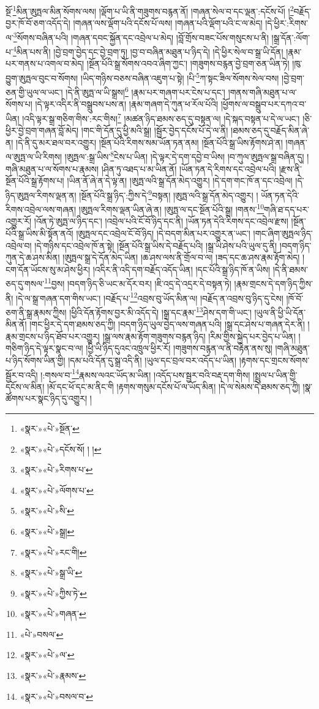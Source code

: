 སྔོ་\footnote{«སྣར་»«པེ་»སྔོན་}མིན་ཨུཏྤལ་མིན་སོགས་ལས། །ལྡོག་པ་ཡི་ནི་གཟུགས་བརྙན་ནོ། །གཞན་སེལ་བ་དང་ལྡན་:དངོས་པོ། །\footnote{«སྣར་»«པེ་»དངོས་སོ། ། །}བརྗོད་བྱར་ཁོ་བོ་ཅག་འདོད་དེ། །གཞན་ལས་ལྡོག་པའི་དངོས་པོ་ལས། །གཞན་པའི་ལྡོག་པའི་ང་ལ་མེད། །དེ་ཕྱིར་:རིགས་ལ་\footnote{«སྣར་»«པེ་»རིགས་པ་}སོགས་བཞིན་པའི། །གཞན་དབང་སྐྱོན་དང་འབྲེལ་པ་མེད། །བློ་གྲོས་བཟང་པོས་གསུངས་པ་ནི། །སྒྲ་དོན་:ལོག་པ་\footnote{«སྣར་»«པེ་»ལོགས་པ་}མིན་པས་ནི། །བྱེ་བྲག་བྱེད་དང་བྱེ་བྲག་ཏུ། །བྱ་བ་བཞིན་མཐུན་པ་ཉིད་དེ། །དེ་ཕྱིར་སེལ་བ་སྒྲ་ཡི་དོན། །རྣམ་པར་གནས་པ་འགལ་བ་མེད། །སྔོན་པོའི་སྒྲ་སོགས་འབའ་ཞིག་ཀྱང་། །གཟུགས་བརྙན་བྱེ་བྲག་ཅན་ཡིན་ཏེ། །ཁུ་བྱུག་ཨུཏྤལ་བུང་བ་སོགས། །ཡིད་གཉིས་བཅས་བཞིན་འཇུག་པ་སྟེ། །པི་\footnote{«སྣར་»«པེ་»སི་}ཀ་སྟང་ཟིལ་སོགས་སེལ་བས། །བྱེ་བྲག་ཅན་གྱི་ཡུལ་ལ་ཡང་། །དེ་ནི་ཨུཏྤ་ལ་ཡི་སྒྲས།\footnote{«སྣར་»«པེ་»སྒྲ།} །རྣམ་པར་གཞག་པར་ངེས་པ་དང་། །གནས་གཞི་མཐུན་པ་ལ་སོགས་པ། །དེ་ལྟར་འདིར་ནི་བསྒྲུབས་པས་ན། །རྣམ་གཞག་དེ་ཀུན་ཕ་རོལ་པོའི། །ཕྱོགས་ལ་བསྒྲུབ་པར་དཀའ་བ་ཡིན། །འདི་ལྟར་སྒྲ་གཅིག་གིས་:རང་གིས།\footnote{«སྣར་»«པེ་»རང་གི།} །མཚན་ཉིད་ཐམས་ཅད་དུ་བསྟན་ལ། །དེ་སྐད་བསྟན་པ་དེ་ལ་ཡང་། །ཅི་ཕྱིར་བྱེ་བྲག་གཞན་བློ་མེད། །གང་གི་དོན་དུ་ཕྱི་མའི་སྒྲ། །སྦྱོར་བྱེད་དངོས་པོ་དེ་ལ་ནི། །ཐམས་ཅད་དུ་བརྗོད་མིན་ཞེ་ན། །དེ་ནི་དུ་མར་ཐལ་བར་འགྱུར། །སྔོན་པོའི་རིགས་སམ་ཡོན་ཏན་ནམ། །སྔོན་པོའི་སྒྲ་ཡིས་རྟོགས་ཤེ་ན། །གཞན་ལ་ཨུཏྤ་ལ་ཡི་རིགས། །ཨུཏྤལ་:སྒྲ་ཡིས་\footnote{«སྣར་»«པེ་»སྒྲ་ཡི་}ངེས་པ་ཡིན། །དེ་ལྟར་དེ་དག་དབྱེ་བ་ཡིས། །བ་ཀུལ་ཨུཏྤལ་སྒྲ་བཞིན་དུ། །གཞི་མཐུན་པ་ལ་སོགས་པ་རྣམས། །ཤིན་ཏུ་འཐད་པ་མ་ཡིན་ནོ། །ཡོན་ཏན་དེ་རིགས་དང་འབྲེལ་པའི། །རྫས་ནི་སྔོན་པོའི་སྒྲ་རྟོགས་པ། །ཡིན་ནོ་ཞེ་ན་དེ་ལྟ་ན། །ཨུཏྤ་ལའི་སྒྲ་དོན་མེད་འགྱུར། །དེ་དག་གང་ཁོ་ན་དང་འབྲེལ། །དེ་ཉིད་ཨུཏྤལ་རིགས་ལྡན་ན། །སྔོན་པོའི་སྒྲ་ཉིད་:ཀྱིས་དེ་\footnote{«སྣར་»«པེ་»ཀྱིས་ཏེ་}བསྟན། །ཨུཏྤ་ལའི་སྒྲ་དོན་མེད་འགྱུར། །
ཡོན་ཏན་དེའི་རིགས་འབྲེལ་ལས་གཞན། །ཨུཏྤལ་རིགས་ལྡན་ཡིན་ཞེ་ན། །ཨུཏྤ་ལ་དང་སྔོན་པོའི་སྒྲ། །གནས་\footnote{«སྣར་»«པེ་»གཞན་}གཞི་ཐ་དད་པར་འགྱུར་རོ། །འོན་ཏེ་ཨུཏྤ་ལ་ཉིད་དང་། །འབྲེལ་པའི་ངོ་བོ་ཉིད་དང་ནི། །ཡོན་ཏན་དེའི་རིགས་དང་འབྲེལ་རྫས། །སྔོན་པོའི་སྒྲ་ཡིས་མི་སྟོན་ནའོ། །ཨུཏྤལ་དང་འབྲེལ་ངོ་བོ་ཉིད། །དེ་བདག་མིན་པར་འགྱུར་ན་ཡང་། །གང་ཞིག་ཨུཏྤལ་ཉིད་འབྲེལ་བ། །དེ་གཉིས་དང་འབྲེལ་ཁོ་ན་སྟེ། །སྔོན་པོའི་སྒྲ་ཡིས་དེ་བརྗོད་པའི། །སྒྲ་ཡི་ཤེས་པའི་ཡུལ་དུ་ནི། །བདག་ཉིད་ཀུན་དེ་ཆ་ཤས་མིན། །ཨུཏྤལ་སྒྲ་དེ་དོན་མེད་ཡིན། །ཆ་ཤས་ལས་ནི་གྲོལ་བ་ལ། །ཟད་དང་ཆ་ཤས་རྣམ་རྟོག་མེད། །ངག་དོན་ཡོངས་སུ་མ་ཤེས་ཕྱིར། །འདིར་ནི་འདི་དག་བརྗོད་འདོད་ཡིན། །དང་པོའི་སྒྲ་ཉིད་ཁོ་ན་ཡིས། །དེ་ནི་ཐམས་ཅད་དུ་གསལ་\footnote{«པེ་»བསལ་}བྱས། །བདག་ཉིད་ཅི་ཡང་མ་དོར་བར། །ཇི་འདྲ་དེ་འདྲར་དེ་བསྟན་ཏེ། །རྣམ་གྲངས་དེ་དག་ཉིད་ཀྱིས་ནི། །དེ་ལ་སྒྲ་གཞན་དག་གིས་ཡང་། །བརྗོད་པ་\footnote{«སྣར་»«པེ་»ལ་}འབྲས་བུ་ཡོད་མིན་ལ། །བརྗོད་ན་འབྲས་བུ་ཉིད་དུ་ངེས། །ཁོ་བོ་ཅག་ནི་སྒྲ་རྣམས་ཀྱིས། །ཕྱིའི་དོན་རྟོགས་བྱར་མི་འདོད་དེ། །སྒྲ་དང་རྣམ་\footnote{«སྣར་»«པེ་»རྣམས་}ཤེས་དག་གི་ཡང་། །ཡུལ་ནི་ཕྱི་ཡི་དོན་མིན་ནོ། །གང་ཕྱིར་དེ་དག་ཐམས་ཅད་ཀྱི། །བདག་ཉིད་ཡུལ་བྱེད་ལས་གཞན་པའི། །སྒྲ་དང་ཤེས་པ་གཞན་དེར་ནི། །རྣམ་གྲངས་པ་ཉིད་ཐོབ་པར་འགྱུར། །སྒྲ་ལས་རྣམ་རྟོག་གཟུགས་བརྙན་ཉིད། །རིམ་གྱིས་སྐྱེད་པར་བྱེད་པ་ཡིན། །གཅིག་ཉིད་དེ་ལྟར་སྣང་བ་ལ། །ཕྱི་ཡི་ཉིད་དུའང་འཁྲུལ་ཕྱིར་རོ། །གཟུགས་བརྙན་ལ་ནི་བརྟེན་ནས་སུ། །གཞི་མཐུན་པ་ཉིད་སོགས་ཡིན་གྱི། །དམ་པའི་དོན་དུ་སྒྲ་འདི་ནི། །ཡུལ་དང་བྲལ་བར་འདོད་པ་ཡིན། །རྟགས་དང་གྲངས་སོགས་སྦྱོར་བ་འདི། །:གསལ་བ་\footnote{«སྣར་»«པེ་»བསལ་བ་}རྣམས་ལའང་ཡོད་མ་ཡིན། །འདོད་པས་སྦྱར་བའི་བརྡ་དག་གིས། །སྤྲུལ་པ་ཡིན་གྱི་དངོས་ལ་མིན། །མོ་དང་ཕོ་དང་མ་ནིང་གི །རྟགས་གསུམ་དངོས་པོ་ལ་ཡོད་མིན། །དེ་ལ་སེམས་དེ་ཐམས་ཅད་ཀྱི། །སྣ་ཚོགས་པར་སྣང་ཉིད་དུ་འགྱུར། །
